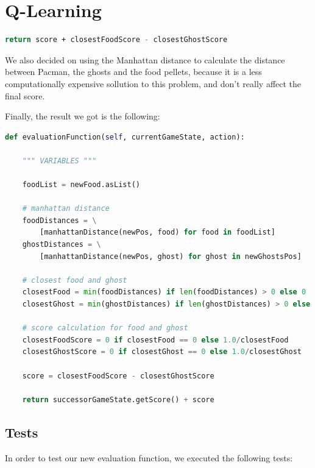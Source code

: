 \documentclass{article}
\begin{document}
\section{Q-Learning}

\hbox{}

\begin{lstlisting}[language=bash, frame=tlbr, framesep=6pt, backgroundcolor=\color{light-gray}]
    return score + closestFoodScore - closestGhostScore
\end{lstlisting}

\hbox{}

We also decided on using the Manhattan distance to calculate the distance between Pacman, the ghosts and the food pellets, because it is a less computationally expensive sollution to this problem, and don't really affect the final score.

\hbox{}

Finally, the result we got is the following:

\hbox{}

\begin{lstlisting}[language=python, frame=tlbr, framesep=6pt, backgroundcolor=\color{light-gray}]
def evaluationFunction(self, currentGameState, action):

    """ VARIABLES """

    foodList = newFood.asList()

    # manhattan distance
    foodDistances = \
        [manhattanDistance(newPos, food) for food in foodList]
    ghostDistances = \
        [manhattanDistance(newPos, ghost) for ghost in newGhostsPos]

    # closest food and ghost
    closestFood = min(foodDistances) if len(foodDistances) > 0 else 0
    closestGhost = min(ghostDistances) if len(ghostDistances) > 0 else 0

    # score calculation for food and ghost
    closestFoodScore = 0 if closestFood == 0 else 1.0/closestFood
    closestGhostScore = 0 if closestGhost == 0 else 1.0/closestGhost

    score = closestFoodScore - closestGhostScore

    return successorGameState.getScore() + score
\end{lstlisting}

\subsection{Tests}

In order to test our new evaluation function, we executed the following tests:
\end{document}
